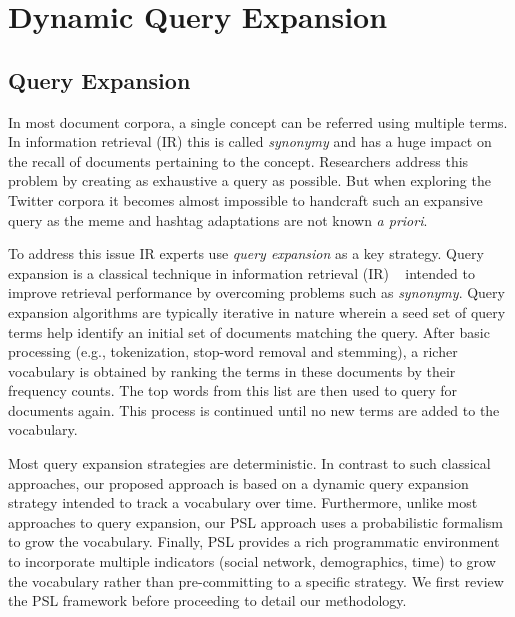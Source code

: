 \chapter{Dynamic Query Expansion}
\section{Query Expansion}
In most document corpora, a single concept can be referred using multiple terms.
In information retrieval (IR) this is called \emph{synonymy} and has a huge impact on the recall of documents pertaining to the concept.
Researchers address this problem by creating as exhaustive a query as possible. 
But when exploring the Twitter corpora it becomes almost impossible to handcraft such an expansive query as the meme and 
hashtag adaptations are not known {\it a priori}.

To address this issue IR experts use \emph{query expansion} as a key strategy.
Query expansion is a classical technique in information retrieval (IR) ~\cite{manning2008introduction} intended to improve
retrieval performance by overcoming problems such as {\it synonymy}. Query expansion algorithms
are typically iterative in nature wherein a seed set of query terms help identify an initial set
of documents matching the query.
After basic processing (e.g.,
tokenization, stop-word removal and stemming), a richer vocabulary is obtained by ranking the 
terms in these documents by their frequency counts.
The top words from this list are then used to query for documents again. 
This process is continued until no new terms are added to the vocabulary. 

Most query expansion strategies are deterministic.
In contrast to such classical approaches,
our proposed approach is based on a dynamic query expansion strategy  intended to track a vocabulary
over time. Furthermore, unlike most approaches to query expansion, our PSL approach uses a probabilistic formalism
to grow the vocabulary. Finally, PSL provides a rich programmatic environment to incorporate 
multiple indicators (social network, demographics, time) to grow the vocabulary rather than pre-committing to a 
specific strategy.
We first review the PSL framework before proceeding to detail our methodology.

